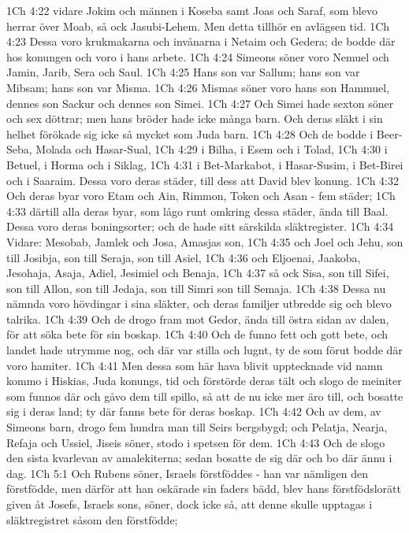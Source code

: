 1Ch 4:22  vidare Jokim och männen i Koseba samt Joas och Saraf, som blevo herrar över Moab, så ock Jasubi-Lehem. Men detta tillhör en avlägsen tid.
1Ch 4:23  Dessa voro krukmakarna och invånarna i Netaim och Gedera; de bodde där hos konungen och voro i hans arbete.
1Ch 4:24  Simeons söner voro Nemuel och Jamin, Jarib, Sera och Saul.
1Ch 4:25  Hans son var Sallum; hans son var Mibsam; hans son var Misma.
1Ch 4:26  Mismas söner voro hans son Hammuel, dennes son Sackur och dennes son Simei.
1Ch 4:27  Och Simei hade sexton söner och sex döttrar; men hans bröder hade icke många barn. Och deras släkt i sin helhet förökade sig icke så mycket som Juda barn.
1Ch 4:28  Och de bodde i Beer-Seba, Molada och Hasar-Sual,
1Ch 4:29  i Bilha, i Esem och i Tolad,
1Ch 4:30  i Betuel, i Horma och i Siklag,
1Ch 4:31  i Bet-Markabot, i Hasar-Susim, i Bet-Birei och i Saaraim. Dessa voro deras städer, till dess att David blev konung.
1Ch 4:32  Och deras byar voro Etam och Ain, Rimmon, Token och Asan - fem städer;
1Ch 4:33  därtill alla deras byar, som lågo runt omkring dessa städer, ända till Baal. Dessa voro deras boningsorter; och de hade sitt särskilda släktregister.
1Ch 4:34  Vidare: Mesobab, Jamlek och Josa, Amasjas son,
1Ch 4:35  och Joel och Jehu, son till Josibja, son till Seraja, son till Asiel,
1Ch 4:36  och Eljoenai, Jaakoba, Jesohaja, Asaja, Adiel, Jesimiel och Benaja,
1Ch 4:37  så ock Sisa, son till Sifei, son till Allon, son till Jedaja, son till Simri son till Semaja.
1Ch 4:38  Dessa nu nämnda voro hövdingar i sina släkter, och deras familjer utbredde sig och blevo talrika.
1Ch 4:39  Och de drogo fram mot Gedor, ända till östra sidan av dalen, för att söka bete för sin boskap.
1Ch 4:40  Och de funno fett och gott bete, och landet hade utrymme nog, och där var stilla och lugnt, ty de som förut bodde där voro hamiter.
1Ch 4:41  Men dessa som här hava blivit upptecknade vid namn kommo i Hiskias, Juda konungs, tid och förstörde deras tält och slogo de meiniter som funnos där och gåvo dem till spillo, så att de nu icke mer äro till, och bosatte sig i deras land; ty där fanns bete för deras boskap.
1Ch 4:42  Och av dem, av Simeons barn, drogo fem hundra man till Seirs bergsbygd; och Pelatja, Nearja, Refaja och Ussiel, Jiseis söner, stodo i spetsen för dem.
1Ch 4:43  Och de slogo den sista kvarlevan av amalekiterna; sedan bosatte de sig där och bo där ännu i dag.
1Ch 5:1  Och Rubens söner, Israels förstföddes - han var nämligen den förstfödde, men därför att han oskärade sin faders bädd, blev hans förstfödslorätt given åt Josefs, Israels sons, söner, dock icke så, att denne skulle upptagas i släktregistret såsom den förstfödde;
